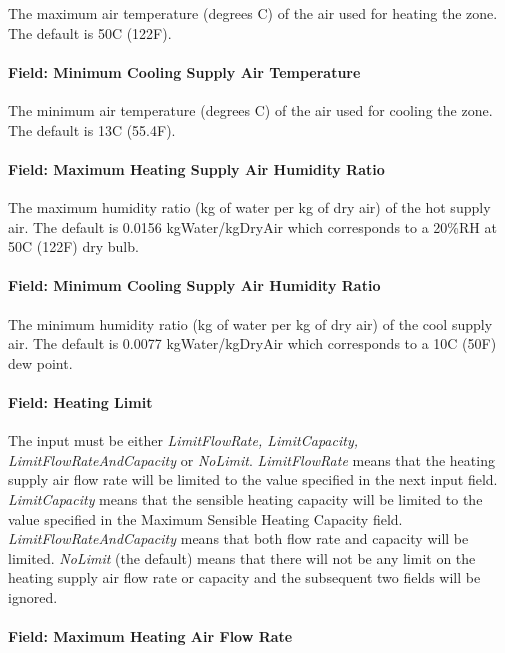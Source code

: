 The maximum air temperature (degrees C) of the air used for heating the zone. The default is 50C (122F).

\paragraph{Field: Minimum Cooling Supply Air Temperature}\label{field-minimum-cooling-supply-air-temperature}

The minimum air temperature (degrees C) of the air used for cooling the zone. The default is 13C (55.4F).

\paragraph{Field: Maximum Heating Supply Air Humidity Ratio}\label{field-maximum-heating-supply-air-humidity-ratio}

The maximum humidity ratio (kg of water per kg of dry air) of the hot supply air. The default is 0.0156 kgWater/kgDryAir which corresponds to a 20\%RH at 50C (122F) dry bulb.

\paragraph{Field: Minimum Cooling Supply Air Humidity Ratio}\label{field-minimum-cooling-supply-air-humidity-ratio}

The minimum humidity ratio (kg of water per kg of dry air) of the cool supply air. The default is 0.0077 kgWater/kgDryAir which corresponds to a 10C (50F) dew point.

\paragraph{Field: Heating Limit}\label{field-heating-limit}

The input must be either \emph{LimitFlowRate, LimitCapacity, LimitFlowRateAndCapacity} or \emph{NoLimit}. \emph{LimitFlowRate} means that the heating supply air flow rate will be limited to the value specified in the next input field. \emph{LimitCapacity} means that the sensible heating capacity will be limited to the value specified in the Maximum Sensible Heating Capacity field. \emph{LimitFlowRateAndCapacity} means that both flow rate and capacity will be limited. \emph{NoLimit} (the default) means that there will not be any limit on the heating supply air flow rate or capacity and the subsequent two fields will be ignored.

\paragraph{Field: Maximum Heating Air Flow Rate}\label{field-maximum-heating-air-flow-rate-000}

